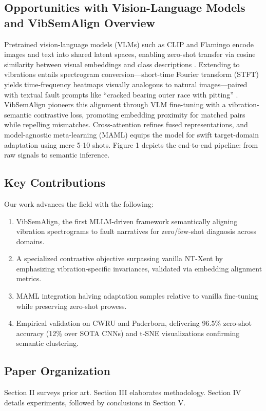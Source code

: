 \subsection{Opportunities with Vision-Language Models and VibSemAlign Overview}

Pretrained vision-language models (VLMs) such as CLIP and Flamingo encode images and text into shared latent spaces, enabling zero-shot transfer via cosine similarity between visual embeddings and class descriptions \cite{cite20}. Extending to vibrations entails spectrogram conversion—short-time Fourier transform (STFT) yields time-frequency heatmaps visually analogous to natural images—paired with textual fault prompts like ``cracked bearing outer race with pitting'' \cite{cite21}. VibSemAlign pioneers this alignment through VLM fine-tuning with a vibration-semantic contrastive loss, promoting embedding proximity for matched pairs while repelling mismatches. Cross-attention refines fused representations, and model-agnostic meta-learning (MAML) equips the model for swift target-domain adaptation using mere 5-10 shots. Figure 1 depicts the end-to-end pipeline: from raw signals to semantic inference.

\subsection{Key Contributions}

Our work advances the field with the following:
\begin{enumerate}
\item VibSemAlign, the first MLLM-driven framework semantically aligning vibration spectrograms to fault narratives for zero/few-shot diagnosis across domains.
\item A specialized contrastive objective surpassing vanilla NT-Xent by emphasizing vibration-specific invariances, validated via embedding alignment metrics.
\item MAML integration halving adaptation samples relative to vanilla fine-tuning while preserving zero-shot prowess.
\item Empirical validation on CWRU and Paderborn, delivering 96.5\% zero-shot accuracy (12\% over SOTA CNNs) and t-SNE visualizations confirming semantic clustering.
\end{enumerate}

\subsection{Paper Organization}

Section II surveys prior art. Section III elaborates methodology. Section IV details experiments, followed by conclusions in Section V.
